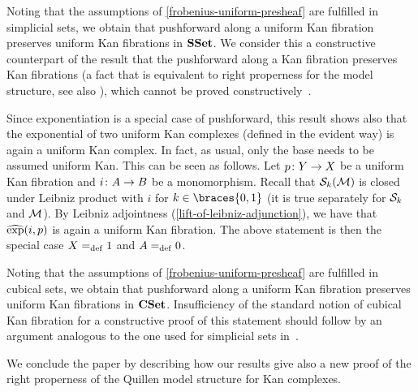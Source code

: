 \documentclass[reqno,10pt,a4paper,oneside,draft]{amsart}
\begin{document}
\begin{example}
Noting that the assumptions of \cref{frobenius-uniform-presheaf} are fulfilled in simplicial sets, we obtain that pushforward along a uniform Kan fibration preserves uniform Kan fibrations in $\SSet$.
We consider this a constructive counterpart of the result that the pushforward along a Kan fibration preserves Kan fibrations (a fact that is equivalent to right properness for the model structure, see also \cite[Lemma 4.3.1]{voevodsky-simplicial-model}), which cannot be proved constructively~\cite{coquand-non-constructivity-kan}.


Since exponentiation is a special case of pushforward, this result shows also that the exponential of two uniform Kan complexes (defined in the evident way) is again a uniform Kan complex.
In fact, as usual, only the base needs to be assumed uniform Kan.
This can be seen as follows. Let $p \co Y \to X$ be a uniform Kan fibration and $i \co A \to B$ be a  monomorphism.
Recall that $\cal{S}_k(\cal{M})$ is closed under Leibniz product with $i$ for $k \in \braces{0, 1}$ (it is true separately for $\cal{S}_k$ and $\cal{M}$).
By Leibniz adjointness (\cref{lift-of-leibniz-adjunction}), we have that $\hatexp(i, p)$ is again a uniform Kan fibration.
The above statement is then the special case $X \defeq 1$ and $A \defeq 0$.
\end{example}

\begin{example}
Noting that the assumptions of \cref{frobenius-uniform-presheaf} are fulfilled in cubical sets, we obtain that pushforward along a uniform Kan fibration preserves uniform Kan fibrations in $\CSet$.
Insufficiency of the standard notion of cubical Kan fibration for a constructive proof 
of this statement should follow by an argument analogous to the one used for simplicial sets in~\cite{coquand-non-constructivity-kan}.
\end{example}

We conclude the paper by describing how our results give also a new proof of the
right properness of the Quillen model structure for Kan complexes. 
\end{document}
